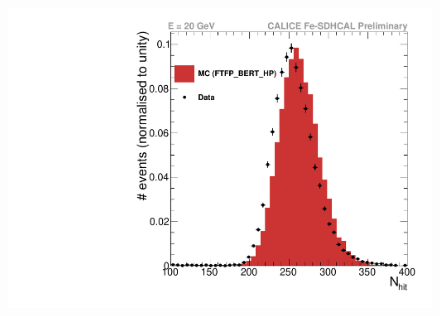 \begin{figure}[!ht]
  \begin{minipage}{.4\textwidth}
    \includegraphics[width=1.0\textwidth]{Digitizer/figs/nhit_e-_20GeV_AugSep2012.pdf}\\
  \end{minipage}
  \hfill
  \begin{minipage}{.6\textwidth}

\end{minipage}
\end{figure}
